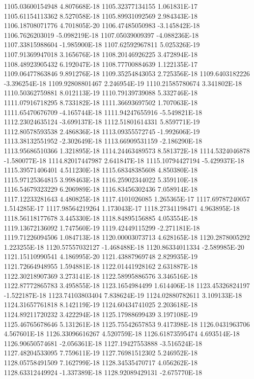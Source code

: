 1105.03600154948  4.807668E-18
1105.32377134155  1.061831E-17
1105.61154113362  8.527058E-18
1105.89931092569  2.984343E-18
1106.18708071776  4.701805E-20
1106.47485050983  -3.145842E-18
1106.7626203019  -5.098219E-18
1107.05039009397  -4.088236E-18
1107.33815988604  -1.985900E-18
1107.62592967811  5.025326E-19
1107.91369947018  3.165676E-18
1108.20146926225  3.472894E-18
1108.48923905432  6.192047E-18
1108.77700884639  1.122135E-17
1109.06477863846  9.891276E-18
1109.35254843053  2.725356E-18
1109.6403182226  -3.396254E-18
1109.92808801467  2.246954E-19
1110.21585780674  3.341802E-18
1110.50362759881  8.012113E-19
1110.79139739088  5.332746E-18
1111.07916718295  8.733182E-18
1111.36693697502  1.707063E-18
1111.65470676709  -4.165744E-18
1111.94247655916  -5.549821E-18
1112.23024635124  -3.699137E-18
1112.51801614331  5.859771E-19
1112.80578593538  2.486836E-18
1113.09355572745  -1.992606E-19
1113.38132551952  -2.302649E-18
1113.66909531159  -2.186290E-18
1113.95686510366  1.321895E-18
1114.24463489573  8.581372E-18
1114.5324046878  -1.580077E-18
1114.82017447987  2.641847E-18
1115.10794427194  -5.429937E-18
1115.39571406401  4.511230E-18
1115.68348385608  4.850380E-18
1115.97125364815  3.998463E-18
1116.25902344022  5.359110E-18
1116.54679323229  6.206989E-18
1116.83456302436  7.058914E-18
1117.12233281643  4.480825E-18
1117.4101026085  1.265365E-17
1117.69787240057  1.514285E-17
1117.98564219264  1.173043E-17
1118.27341198471  4.963895E-18
1118.56118177678  3.445330E-18
1118.84895156885  4.053554E-18
1119.13672136092  1.747560E-19
1119.42449115299  -2.271181E-18
1119.71226094506  1.084713E-18
1120.00003073713  4.628165E-18
1120.2878005292  1.223255E-18
1120.57557032127  -1.468488E-18
1120.86334011334  -2.589985E-20
1121.15110990541  4.186995E-20
1121.43887969748  2.829935E-19
1121.72664948955  1.594881E-18
1122.01441928162  2.631887E-18
1122.30218907369  3.273141E-18
1122.58995886576  3.346516E-18
1122.87772865783  3.495855E-18
1123.1654984499  1.614406E-18
1123.45326824197  -1.522187E-18
1123.74103803404  7.838624E-19
1124.02880782611  3.109133E-18
1124.31657761818  8.142119E-19
1124.60434741025  2.203618E-18
1124.89211720232  3.422294E-18
1125.17988699439  3.197108E-19
1125.46765678646  5.131261E-18
1125.75542657853  9.417398E-18
1126.0431963706  4.567601E-18
1126.33096616267  4.520759E-18
1126.61873595474  4.693514E-18
1126.90650574681  -2.056361E-18
1127.19427553888  -3.516524E-18
1127.48204533095  7.759611E-19
1127.76981512302  5.246952E-18
1128.05758491509  7.162799E-18
1128.34535470717  4.056262E-18
1128.63312449924  -1.337389E-18
1128.92089429131  -2.675770E-18
